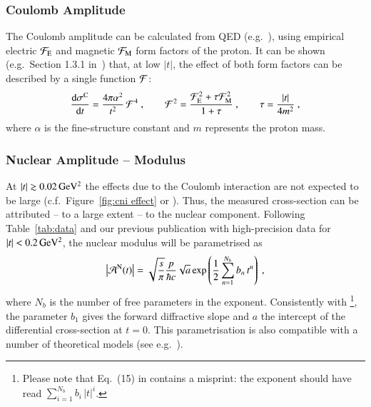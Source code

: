 \subsubsection{Coulomb Amplitude}
\label{sec:cni coulomb}
%
The Coulomb amplitude can be calculated from QED (e.g.~\cite{block96}), using empirical electric ${\cal F}_{\rm E}$ and magnetic ${\cal F}_{\rm M}$ form factors of the proton. It can be shown (e.g.~Section 1.3.1 in~\cite{jan_thesis}) that, at low $|t|$, the effect of both form factors can be described by a single function ${\cal F}$:
\begin{equation}
\label{eq:coul cs}
	{\d\sigma^{\rm C}\over \d t} = {4\pi\alpha^2\over t^2}\,{\cal F}^4\ ,\qquad 
	{\cal F}^2 = {{\cal F}_{\rm E}^2 + \tau {\cal F}_{\rm M}^2\over 1 + \tau}\ ,\qquad 
	\tau = {|t|\over 4m^2}\ ,
\end{equation}
where $\alpha$ is the fine-structure constant and $m$ represents the proton mass.



\subsubsection{Nuclear Amplitude -- Modulus}
\label{sec:cni nuclear modulus}

At $|t| \gtrsim 0.02\,{\rm GeV^2}$ the effects due to the Coulomb interaction are not expected to be large (c.f.~Figure~\ref{fig:cni effect} or \cite{kklp11}). Thus, the measured cross-section can be attributed -- to a large extent -- to the nuclear component. Following Table~\ref{tab:data} and our previous publication \cite{8tev-90m} with high-precision data for $|t| < 0.2\,{\rm GeV^2}$, the nuclear modulus will be parametrised as
\begin{equation}
\label{eq:nuc mod}
\left | {\cal A}^{\rm N}(t) \right | = \sqrt{s\over\pi} {p\over \hbar c} \sqrt{a} \exp\left( {1\over 2} \sum\limits_{n = 1}^{N_b} b_n\, t^n \right)\ ,
\end{equation}
where $N_b$ is the number of free parameters in the exponent. Consistently with \cite{8tev-90m} \footnote{%
Please note that Eq.~(15) in \cite{8tev-90m} contains a misprint: the exponent should have read $\sum\limits_{i=1}^{N_b} b_i\, |t|^i$.
}, the parameter $b_1$ gives the forward diffractive slope and $a$ the intercept of the differential cross-section at $t=0$. This parametrisation is also compatible with a number of theoretical models (see e.g.~\cite{elegent}).

